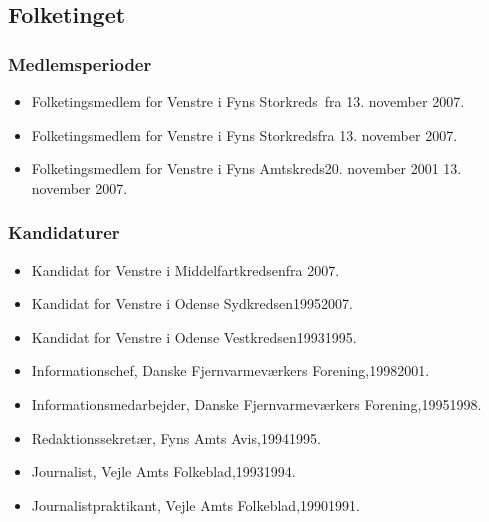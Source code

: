 \documentclass[11pt, a4paper]{awesome-cv}
\begin{document}
\begin{cvletter}
\subsection*{Folketinget}
\subsubsection*{Medlemsperioder}
\begin{itemize}
\item Folketingsmedlem for Venstre i Fyns Storkreds fra 13. november 2007.
\item Folketingsmedlem for Venstre i Fyns Storkredsfra 13. november 2007.
\item Folketingsmedlem for Venstre i Fyns Amtskreds20. november 2001  13. november 2007.
\end{itemize}
\subsubsection*{Kandidaturer}
\begin{itemize}
\item Kandidat for Venstre i Middelfartkredsenfra 2007.
\item Kandidat for Venstre i Odense Sydkredsen19952007.
\item Kandidat for Venstre i Odense Vestkredsen19931995.
\end{itemize}
\begin{itemize}
\item Informationschef, Danske Fjernvarmeværkers Forening,19982001.
\item Informationsmedarbejder, Danske Fjernvarmeværkers Forening,19951998.
\item Redaktionssekretær, Fyns Amts Avis,19941995.
\item Journalist, Vejle Amts Folkeblad,19931994.
\item Journalistpraktikant, Vejle Amts Folkeblad,19901991.
\end{itemize}
\end{cvletter}
\end{document}
